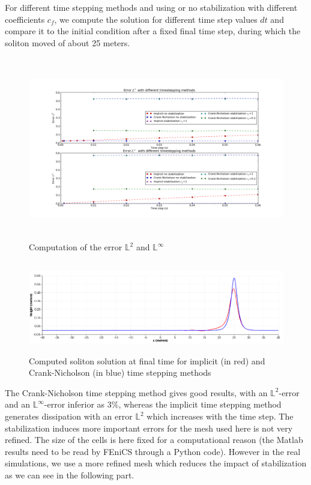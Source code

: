 \documentclass[11pt,a4paper]{article}
\begin{document}
	For different time stepping methods and using or no stabilization with different coefficients $c_f$, we compute the solution for different time step values $dt$ and compare it to the initial condition after a fixed final time step, during which the soliton moved of about 25 meters. 
	\begin{figure}[!h]
		\centering
		\includegraphics[height=8cm]{ErrorL2L801.png}
		\caption{Computation of the error $\mathbb{L}^2$ and $\mathbb{L}^{\infty}$}
	\end{figure}
	
	\begin{figure}[!h]
		\centering
		\includegraphics[height=4cm]{SolitonSolution.png}
		\caption{Computed soliton solution at final time for implicit (in red) and Crank-Nicholson (in blue) time stepping methods}
	\end{figure}
	
	The Crank-Nicholson time stepping method gives good results, with an $\mathbb{L}^2$-error and an $\mathbb{L}^{\infty}$-error inferior as $3\%$, whereas the implicit time stepping method generates dissipation with an error $\mathbb{L}^2$ which increases with the time step. The stabilization induces more important errors for the mesh used here is not very refined. The size of the cells is here fixed for a computational reason (the Matlab results need to be read by FEniCS through a Python code). However in the real simulations, we use a more refined mesh which reduces the impact of stabilization as we can see in the following part. 
				
\end{document}
